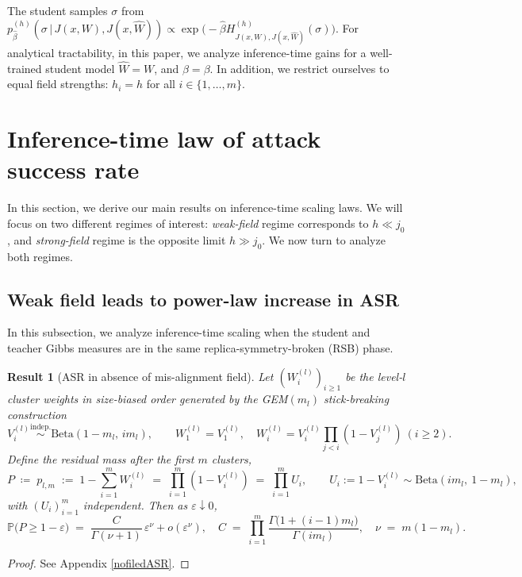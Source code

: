 \documentclass{article}
\newtheorem{theorem}{Result}
\theoremstyle{remark} %
\begin{document}
The student samples $\sigma$ from $p_{\hat \beta}^{(h)}(\sigma\,|\,J(x,W), J(x,\hat W)) \propto \exp\!\big(-{\hat \beta} H^{(h)}_{J(x,W), J(x,\hat W)}(\sigma)\big)$.
For analytical tractability, in this paper, we analyze inference-time gains for a well-trained student model $\hat W=W$,  and $\hat\beta=\beta$. In addition, we restrict ourselves to equal field strengths: $h_i = h$ for all $i \in \{1, \ldots, m\}$.  







\section{Inference-time law of attack success rate}

In this section, we derive our main results on inference-time scaling laws. We will focus on two different regimes of interest: \emph{weak-field} regime corresponds to $h\ll j_0$, and \emph{strong-field} regime is the opposite limit $h\gg j_0$. We now turn to analyze both regimes.

\subsection{Weak field leads to power-law increase in ASR}
\label{sec:cluster_tilt}

In this subsection, we analyze inference-time scaling when the student and teacher Gibbs measures are in the same replica-symmetry-broken (RSB) phase. 

\begin{theorem}[ASR in absence of mis-alignment field]\label{thm:edge_PD}
 Let $(W_i^{(l)})_{i\ge1}$ be the level-$l$ cluster weights in
size-biased order generated by the GEM$(m_l)$ stick-breaking construction
\[
V_i^{(l)} \stackrel{\text{indep.}}{\sim} \mathrm{Beta}(1-m_l,\, i m_l),
\qquad
W^{(l)}_1=V^{(l)}_1,\quad
W^{(l)}_i=V^{(l)}_i\prod_{j<i}(1-V^{(l)}_j)\ (i\ge2).
\]
Define the residual mass after the first $m$ clusters,
\[
P \;\coloneqq\; p_{l,m} \;:=\; 1-\sum_{i=1}^m W_i^{(l)}
\;=\;\prod_{i=1}^m (1-V_i^{(l)}) \;=\;\prod_{i=1}^m U_i,
\qquad
U_i:=1-V_i^{(l)}\sim \mathrm{Beta}(i m_l,\ 1-m_l),
\]
with $(U_i)_{i=1}^m$ independent. Then as $\varepsilon\downarrow 0$,
\begin{equation}
\mathbb P\!\big(P\ge 1-\varepsilon\big)
\;=\;
\frac{C}{\Gamma(\nu+1)}\,\varepsilon^{\nu} + o(\varepsilon^{\nu}),
 \quad C\;=\;\prod_{i=1}^{m}\frac{\Gamma\!\big(1+(i-1)m_l\big)}{\Gamma(im_l)}, \quad
\nu \;=\; m(1-m_l).
\label{eq:edge_law_PD}
\end{equation}
\end{theorem}
\begin{proof}
    See Appendix \ref{nofiledASR}.
\end{proof}
\end{document}
